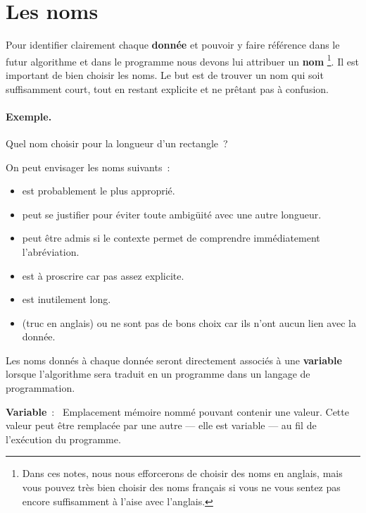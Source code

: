 	\section{Les noms}
	
		Pour identifier clairement chaque \textbf{donnée}
		et pouvoir y faire référence dans le futur algorithme
		et dans le programme
		nous devons lui attribuer un \textbf{nom}%
		\footnote{%
				Dans ces notes, nous nous efforcerons de choisir des noms en 
				anglais,
				mais vous pouvez très bien choisir
				des noms français si vous ne vous sentez pas encore suffisamment 
				à l'aise avec l'anglais.
		}.
		Il est important de bien choisir les noms. 
		Le but est de trouver un nom qui soit suffisamment court,
		tout en restant explicite et ne prêtant pas à confusion.
		
	
		\begin{Emphase}
			\paragraph{Exemple.}	
			Quel nom choisir pour la longueur d’un rectangle~?
	
			On peut envisager les noms suivants~:
			\begin{itemize}
			\item
				 est probablement le plus approprié.
			\item
				 peut se justifier
				pour éviter toute ambigüité avec une autre longueur.
			\item
				 peut être admis
				si le contexte permet de comprendre immédiatement
				l’abréviation.
			\item
				 est à proscrire car pas assez explicite.
			\item
				 est inutilement long. 
			\item
				 (truc en anglais) ou  ne sont pas de bons choix
				car ils n’ont aucun lien avec la donnée.
			\end{itemize}
		\end{Emphase}

		Les noms donnés à chaque donnée seront directement associés à une 
		\textbf{variable} lorsque l'algorithme sera traduit en un programme dans 
		un langage de programmation. 
		
		 \textbf{Variable}~:~ Emplacement
		mémoire nommé pouvant contenir une valeur. Cette valeur peut être
		remplacée par une autre — elle est variable — au fil de l'exécution du
		programme. 
		
